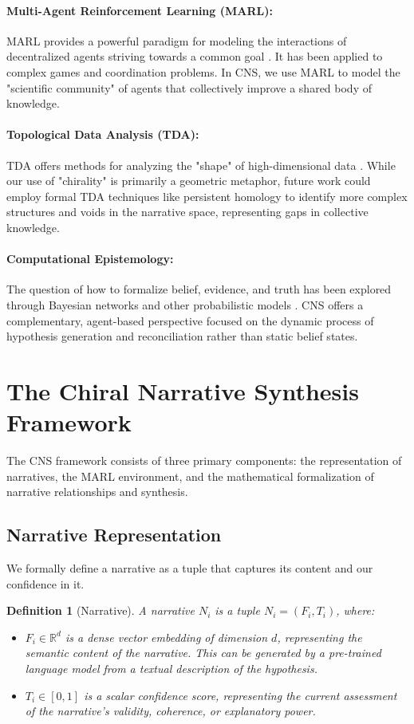 \documentclass[12pt, a4paper]{article}
\newtheorem{definition}{Definition}
\begin{document}
\paragraph{Multi-Agent Reinforcement Learning (MARL):} MARL provides a powerful paradigm for modeling the interactions of decentralized agents striving towards a common goal \cite{Busoniu2008MARL}. It has been applied to complex games and coordination problems. In CNS, we use MARL to model the "scientific community" of agents that collectively improve a shared body of knowledge.

\paragraph{Topological Data Analysis (TDA):} TDA offers methods for analyzing the "shape" of high-dimensional data \cite{Carlsson2009TDA}. While our use of "chirality" is primarily a geometric metaphor, future work could employ formal TDA techniques like persistent homology to identify more complex structures and voids in the narrative space, representing gaps in collective knowledge.

\paragraph{Computational Epistemology:} The question of how to formalize belief, evidence, and truth has been explored through Bayesian networks and other probabilistic models \cite{Boström2017}. CNS offers a complementary, agent-based perspective focused on the dynamic process of hypothesis generation and reconciliation rather than static belief states.

\section{The Chiral Narrative Synthesis Framework}

The CNS framework consists of three primary components: the representation of narratives, the MARL environment, and the mathematical formalization of narrative relationships and synthesis.

\subsection{Narrative Representation}
We formally define a narrative as a tuple that captures its content and our confidence in it.

\begin{definition}[Narrative]
A narrative $N_i$ is a tuple $N_i = (F_i, T_i)$, where:
\begin{itemize}
    \item $F_i \in \mathbb{R}^d$ is a dense vector embedding of dimension $d$, representing the semantic content of the narrative. This can be generated by a pre-trained language model from a textual description of the hypothesis.
    \item $T_i \in [0, 1]$ is a scalar confidence score, representing the current assessment of the narrative's validity, coherence, or explanatory power.
\end{itemize}
\end{definition}
\end{document}
